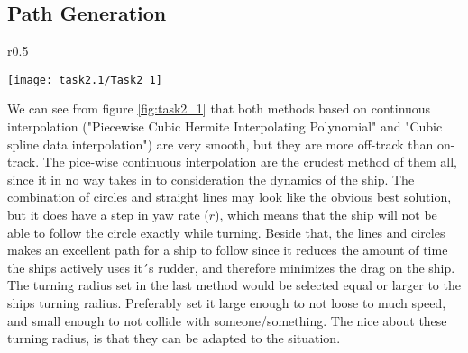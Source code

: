 \subsection{Path Generation}\label{sec:prob2.1}
\begin{wrapfigure}{r}{0.5 \textwidth}
    \begin{center}
     \texttt{[image: task2.1/Task2\_1]}
     \end{center}
    \caption{Different trajectories}
    \label{fig:task2_1}
\end{wrapfigure}
We can see from figure \ref{fig:task2_1} that both methods based on continuous interpolation ("Piecewise Cubic Hermite Interpolating Polynomial" and "Cubic spline data interpolation") are very smooth, but they are more off-track than on-track. The pice-wise continuous interpolation are the crudest method of them all, since it in no way takes in to consideration the dynamics of the ship. The combination of circles and straight lines may look like the obvious best solution, but it does have a step in yaw rate ($r$), which means that the ship will not be able to follow the circle exactly while turning. Beside that, the lines and circles makes an excellent path for a ship to follow since it reduces the amount of time the ships actively uses it´s rudder, and therefore minimizes the drag on the ship. The turning radius set in the last method would be selected equal or larger to the ships turning radius. Preferably set it large enough to not loose to much speed, and small enough to not collide with someone/something. The nice about these turning radius, is that they can be adapted to the situation.

